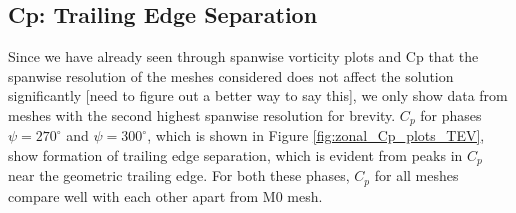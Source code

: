 \subsection{Cp: Trailing Edge Separation}


Since we have already seen through spanwise vorticity plots and Cp that the spanwise resolution of the meshes considered does not affect the solution significantly [need to figure out a better way to say this], we only show data from meshes with the second highest spanwise resolution for brevity. 
$C_p$ for phases $\psi=270^\circ$ and $\psi=300^\circ$, which is shown in Figure \ref{fig:zonal_Cp_plots_TEV}, show formation of trailing edge separation, which is evident from peaks in $C_p$ near the geometric trailing edge. 
For both these phases, $C_p$ for all meshes compare well with each other apart from M0 mesh.


